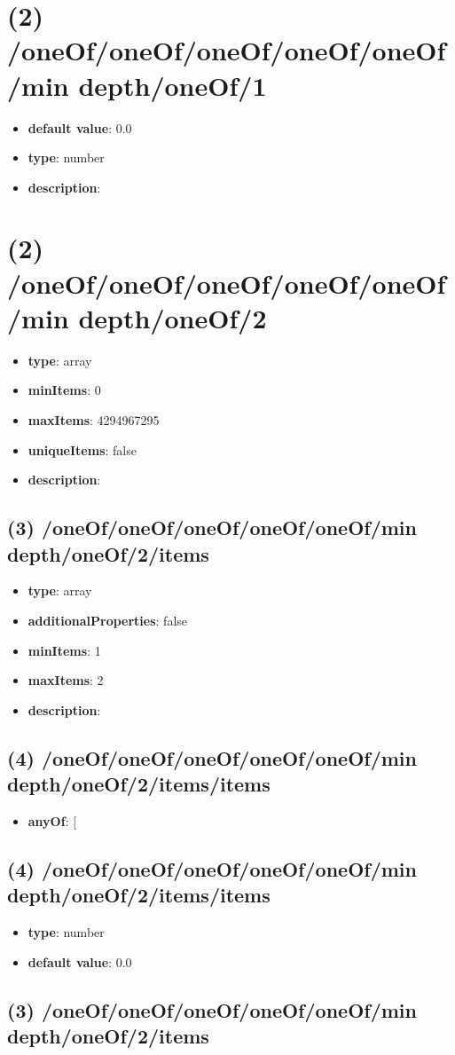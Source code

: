 \section{(2) /oneOf/oneOf/oneOf/oneOf/oneOf/min depth/oneOf/1}
\begin{itemize}[leftmargin=2em]\item {\bf default value}: 0.0
\item {\bf type}: number
\item {\bf description}: 
\end{itemize}\section{(2) /oneOf/oneOf/oneOf/oneOf/oneOf/min depth/oneOf/2}
\begin{itemize}[leftmargin=2em]\item {\bf type}: array
\item {\bf minItems}: 0
\item {\bf maxItems}: 4294967295
\item {\bf uniqueItems}: false
\item {\bf description}: 
\end{itemize}\subsection{(3) /oneOf/oneOf/oneOf/oneOf/oneOf/min depth/oneOf/2/items}
\begin{itemize}[leftmargin=3em]\item {\bf type}: array
\item {\bf additionalProperties}: false
\item {\bf minItems}: 1
\item {\bf maxItems}: 2
\item {\bf description}: 
\end{itemize}\subsection{(4) /oneOf/oneOf/oneOf/oneOf/oneOf/min depth/oneOf/2/items/items}
\begin{itemize}[leftmargin=4em]\item {\bf anyOf}: [\end{itemize}\subsection{(4) /oneOf/oneOf/oneOf/oneOf/oneOf/min depth/oneOf/2/items/items}
\begin{itemize}[leftmargin=4em]\item {\bf type}: number\item {\bf default value}: 0.0
\end{itemize}\subsection{(3) /oneOf/oneOf/oneOf/oneOf/oneOf/min depth/oneOf/2/items}
